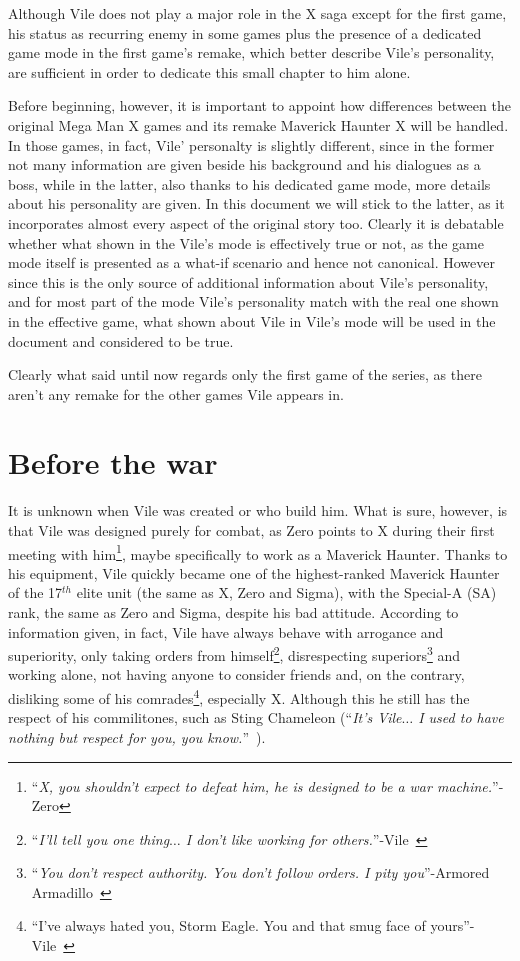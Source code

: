 Although Vile does not play a major role in the X saga except for the first game, his status as recurring enemy in some games plus the presence of a dedicated game mode in the first game's remake, which better describe Vile's personality, are sufficient in order to dedicate this small chapter to him alone. 

Before beginning, however, it is important to appoint how differences between the original Mega Man X games and its remake Maverick Haunter X will be handled. In those games, in fact, Vile' personalty is slightly different, since in the former not many information are given beside his background and his dialogues as a boss, while in the latter, also thanks to his dedicated game mode, more details about his personality are given. In this document we will stick to the latter, as it incorporates almost every aspect of the original story too. Clearly it is debatable whether what shown in the Vile's mode is effectively true or not, as the game mode itself is presented as a what-if scenario and hence not canonical. However since this is the only source of additional information about Vile's personality, and for most part of the mode Vile's personality match with the real one shown in the effective game, what shown about Vile in Vile's mode will be used in the document and considered to be true.

Clearly what said until now regards only the first game of the series, as there aren't any remake for the other games Vile appears in.

\section{Before the war}
It is unknown when Vile was created or who build him. What is sure, however, is that Vile was designed purely for combat, as Zero points to X during their first meeting with him\footnote{``\textit{X, you shouldn't expect to defeat him, he is designed to be a war machine.}''- Zero}, maybe specifically to work as a Maverick Haunter. Thanks to his equipment, Vile quickly became one of the highest-ranked Maverick Haunter of the 17$^{th}$ elite unit (the same as X, Zero and Sigma), with the Special-A (SA) rank, the same as Zero and Sigma, despite his bad attitude. According to information given, in fact, Vile have always behave with arrogance and superiority, only taking orders from himself\footnote{``\textit{I'll tell you one thing$\dots$ I don't like working for others.}''-Vile~\cite{MHX:Vile_script}}, disrespecting superiors\footnote{``\textit{You don't respect authority. You don't follow orders. I pity you}''-Armored Armadillo~\cite{MHX:Vile_script}} and working alone, not having anyone to consider friends and, on the contrary, disliking some of his comrades\footnote{``I've always hated you, Storm Eagle. You and that smug face of yours''-Vile~\cite{MHX:Vile_script}}, especially X. Although this he still has the respect of his commilitones, such as Sting Chameleon (``\textit{It's Vile$\dots$ I used to have nothing but respect for you, you know.}''~\cite{MHX:Vile_script}).

